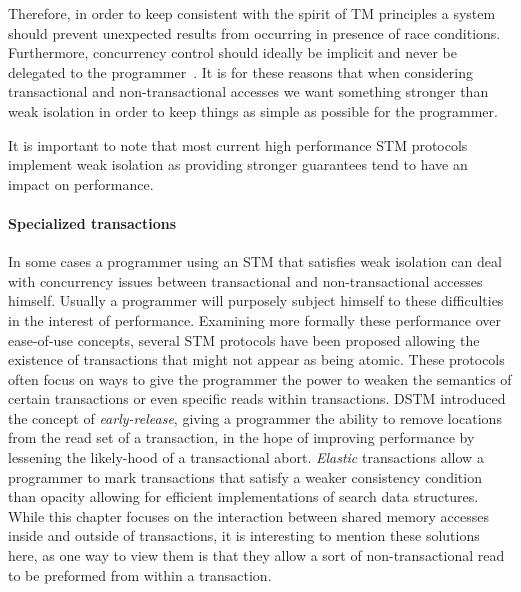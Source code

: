 Therefore, in order  to keep consistent with  the spirit of TM  principles a
system should prevent unexpected   results  from   occurring  
in presence of  race conditions. 
Furthermore, concurrency   control should  ideally be implicit  
and never be delegated to  the programmer~\cite{CIR11,MS12}.
It is for these reasons that when considering transactional and non-transactional accesses
we want something stronger than weak isolation in order to keep things
as simple as possible for the programmer.

It is important to note that most current high performance STM protocols implement weak isolation
as providing stronger guarantees tend to have an impact on performance.



\paragraph{Specialized transactions}
In some cases a programmer using an STM that satisfies
weak isolation can deal with concurrency issues between transactional
and non-transactional accesses himself.
Usually a programmer will purposely subject himself to these
difficulties in the interest of performance.
Examining more formally these performance over ease-of-use concepts, several
STM protocols have been proposed allowing the existence of transactions
that might not appear as being atomic.
These protocols often focus on ways to give the programmer the power to weaken the semantics
of certain transactions or even specific reads within transactions.
DSTM \cite{HLMS03} introduced the concept of \emph{early-release}, giving a programmer
the ability to remove locations from the read set of a transaction,
in the hope of improving performance by lessening the likely-hood of a
transactional abort.
\emph{Elastic} transactions \cite{FGG09} allow a programmer to mark transactions that
satisfy a weaker consistency condition than opacity allowing for efficient
implementations of search data structures.
While this chapter focuses on the interaction between shared memory accesses
inside and outside of transactions, it is interesting to mention
these solutions here, as one way to view them is that they allow a sort of non-transactional read
to be preformed from within a transaction.


